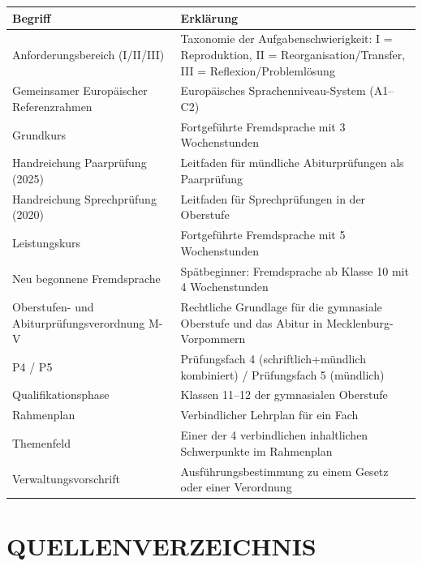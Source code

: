 \documentclass[10pt,a4paper]{article}
\begin{document}
\begin{center}
\small
\begin{tabular}{|l|p{10cm}|}
\hline
\rowcolor{lightgray}
\textbf{Begriff} & \textbf{Erklärung} \\
\hline
Anforderungsbereich (I/II/III) & Taxonomie der Aufgabenschwierigkeit: I = Reproduktion, II = Reorganisation/Transfer, III = Reflexion/Problemlösung \\
\hline
Gemeinsamer Europäischer Referenzrahmen & Europäisches Sprachenniveau-System (A1--C2) \\
\hline
Grundkurs & Fortgeführte Fremdsprache mit 3 Wochenstunden \\
\hline
Handreichung Paarprüfung (2025) & Leitfaden für mündliche Abiturprüfungen als Paarprüfung \\
\hline
Handreichung Sprechprüfung (2020) & Leitfaden für Sprechprüfungen in der Oberstufe \\
\hline
Leistungskurs & Fortgeführte Fremdsprache mit 5 Wochenstunden \\
\hline
Neu begonnene Fremdsprache & Spätbeginner: Fremdsprache ab Klasse 10 mit 4 Wochenstunden \\
\hline
Oberstufen- und Abiturprüfungsverordnung M-V & Rechtliche Grundlage für die gymnasiale Oberstufe und das Abitur in Mecklenburg-Vorpommern \\
\hline
P4 / P5 & Prüfungsfach 4 (schriftlich+mündlich kombiniert) / Prüfungsfach 5 (mündlich) \\
\hline
Qualifikationsphase & Klassen 11--12 der gymnasialen Oberstufe \\
\hline
Rahmenplan & Verbindlicher Lehrplan für ein Fach \\
\hline
Themenfeld & Einer der 4 verbindlichen inhaltlichen Schwerpunkte im Rahmenplan \\
\hline
Verwaltungsvorschrift & Ausführungsbestimmung zu einem Gesetz oder einer Verordnung \\
\hline
\end{tabular}
\end{center}

\vspace{1cm}

\section*{QUELLENVERZEICHNIS}
\end{document}
